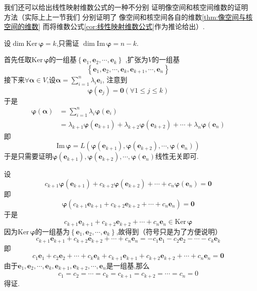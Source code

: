 \begin{brown}
    \begin{problem}
我们还可以给出线性映射维数公式的一种不分别
证明像空间和核空间维数的证明方法（实际上上一节我们
分别证明了
像空间和核空间各自的维数\cref{thm:像空间与核空间的维数}
而将维数公式\cref{cor:线性映射维数公式}作为推论给出）.
    \end{problem}
\begin{Proof}
设$\dim \mathrm{Ker}\,\bm{\varphi}=k$,只需证
$\dim \mathrm{Im}\,\bm{\varphi}=n-k$.

首先任取$\mathrm{Ker}\,\bm{\varphi}$的一组基$\left\{
    \bm{e}_1,\bm{e}_2,\cdots,\bm{e}_k
\right\}$
,扩张为$V$的一组基\[\left\{
    \bm{e}_1,\bm{e}_2,\cdots,\bm{e}_k,\bm{e}_{k+1},\cdots,\bm{e}_n
\right\}\]
接下来$\forall \bm{\alpha}\in V$,设$\displaystyle
\bm{\alpha}=\sum_{i=1}^n\lambda_i\bm{e}_i$,
注意到\[
\bm{\varphi}\left(\bm{e}_j\right)=\bm{0}\left(\forall 1\leqslant j\leqslant k\right)
\]
于是
\begin{align*}
    \bm{\varphi}\left(\bm{\alpha}\right)&=\sum_{i=1}^{n}\lambda_i\bm{\varphi}\left(\bm{e}_i\right)\\
    &=\lambda_{k+1}\bm{\varphi}\left(\bm{e}_{k+1}\right)+
    \lambda_{k+2}\bm{\varphi}\left(\bm{e}_{k+2}\right)+\cdots+
    \lambda_n\bm{\varphi}\left(\bm{e}_n\right)
\end{align*}
即\[
\mathrm{Im}\,\bm{\varphi}=L\left(
    \bm{\varphi}\left(\bm{e}_{k+1}\right),
    \bm{\varphi}\left(\bm{e}_{k+2}\right),
    \cdots,
    \bm{\varphi}\left(\bm{e}_{n}\right)
\right)
\]
于是只需要证明$\bm{\varphi}\left(\bm{e}_{k+1}\right),
    \bm{\varphi}\left(\bm{e}_{k+2}\right),
    \cdots,
    \bm{\varphi}\left(\bm{e}_{n}\right)$线性无关即可.

设
\[
c_{k+1}\bm{\varphi}\left(\bm{e}_{k+1}\right)+c_{k+2}
    \bm{\varphi}\left(\bm{e}_{k+2}\right)+
    \cdots+c_n
    \bm{\varphi}\left(\bm{e}_{n}\right)=\bm{0}
\]
即
\[
\bm{\varphi}\left(
    c_{k+1}\bm{e}_{k+1}+c_{k+2}\bm{e}_{k+2}+\cdots
    +c_n\bm{e}_n
\right)=\bm{0}
\]
于是
\[
 c_{k+1}\bm{e}_{k+1}+c_{k+2}\bm{e}_{k+2}+\cdots
    +c_n\bm{e}_n\in \mathrm{Ker}\,\bm{\varphi}
\]
因为$\mathrm{Ker}\,\bm{\varphi}$的一组基为$\left\{
    \bm{e}_1,\bm{e}_2,\cdots,\bm{e}_k
\right\}$,故得到（符号只是为了方便说明）
\[
c_{k+1}\bm{e}_{k+1}+c_{k+2}\bm{e}_{k+2}+\cdots
    +c_n\bm{e}_n=-c_1\bm{e}_1-c_2\bm{e}_2-\cdots-c_k\bm{e}_k
\]
即
\[
c_1\bm{e}_1+c_2\bm{e}_2+\cdots
+c_k\bm{e}_k+c_{k+1}\bm{e}_{k+1}+c_{k+2}\bm{e}_{k+2}+\cdots
    +c_n\bm{e}_n=\bm{0}
\]
由于$\bm{e}_1,\bm{e}_2,\cdots,\bm{e}_k,\bm{e}_{k+1},\bm{e}_{k+2},\cdots,
\bm{e}_n$是一组基,那么
\[
c_1=c_2=\cdots=c_{k}=c_{k+1}=c_{k+2}=\cdots=c_n=0
\]
得证.
\end{Proof}
\end{brown}
